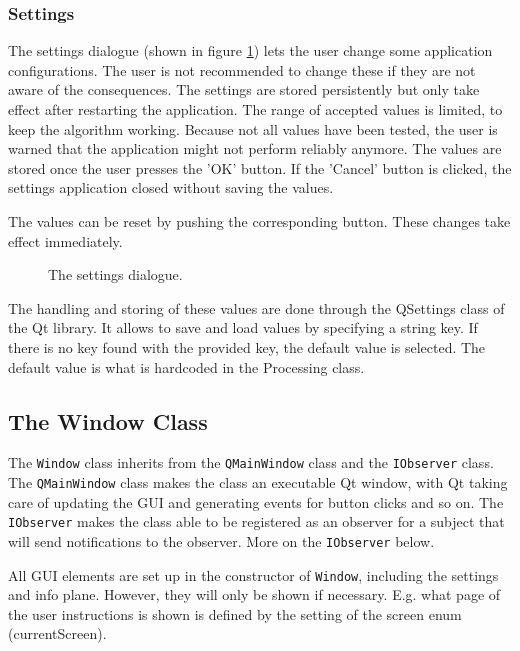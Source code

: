 \subsubsection{Settings}
The settings dialogue (shown in figure \ref{fig:UIsettings}) lets the user change some application configurations. The user is not recommended to change these if they are not aware of the consequences. The settings are stored persistently but only take effect after restarting the application. The range of accepted values is limited, to keep the algorithm working. Because not all values have been tested, the user is warned that the application might not perform reliably anymore. The values are stored once the user presses the 'OK' button. If the 'Cancel' button is clicked, the settings application closed without saving the values.

The values can be reset by pushing the corresponding button. These changes take effect immediately. 

\begin{figure}[ht]
\centering
\caption{The settings dialogue.}
\label{fig:UIsettings}
\end{figure}

The handling and storing of these values are done through the QSettings class of the Qt library. It allows to save and load values by specifying a string key. If there is no key found with the provided key, the default value is selected. The default value is what is hardcoded in the Processing class.

\subsection{The Window Class}
The \texttt{Window} class inherits from the \texttt{QMainWindow} class and the \texttt{IObserver} class. The \texttt{QMainWindow} class makes the class an executable Qt window, with Qt taking care of updating the GUI and generating events for button clicks and so on. The \texttt{IObserver} makes the class able to be registered as an observer for a subject that will send notifications to the observer. More on the \texttt{IObserver} below.

All GUI elements are set up in the constructor of  \texttt{Window}, including the settings and info plane. However, they will only be shown if necessary. E.g. what page of the user instructions is shown is defined by the setting of the screen enum (currentScreen).

